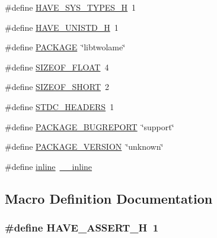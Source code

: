 \begin{DoxyCompactItemize}
\item 
\#define \hyperlink{lib-src_2twolame_2win32_2configwin_8h_a69dc70bea5d1f8bd2be9740e974fa666}{H\+A\+V\+E\+\_\+\+S\+Y\+S\+\_\+\+T\+Y\+P\+E\+S\+\_\+H}~1
\item 
\#define \hyperlink{lib-src_2twolame_2win32_2configwin_8h_a219b06937831d0da94d801ab13987639}{H\+A\+V\+E\+\_\+\+U\+N\+I\+S\+T\+D\+\_\+H}~1
\item 
\#define \hyperlink{lib-src_2twolame_2win32_2configwin_8h_aca8570fb706c81df371b7f9bc454ae03}{P\+A\+C\+K\+A\+GE}~\char`\"{}libtwolame\char`\"{}
\item 
\#define \hyperlink{lib-src_2twolame_2win32_2configwin_8h_a0c4343d1f6e7b7ce4f470d9ea69ad0b4}{S\+I\+Z\+E\+O\+F\+\_\+\+F\+L\+O\+AT}~4
\item 
\#define \hyperlink{lib-src_2twolame_2win32_2configwin_8h_a391756f658c0bdad5fa65c4cd3410ad6}{S\+I\+Z\+E\+O\+F\+\_\+\+S\+H\+O\+RT}~2
\item 
\#define \hyperlink{lib-src_2twolame_2win32_2configwin_8h_a550e5c272cc3cf3814651721167dcd23}{S\+T\+D\+C\+\_\+\+H\+E\+A\+D\+E\+RS}~1
\item 
\#define \hyperlink{lib-src_2twolame_2win32_2configwin_8h_a1d1d2d7f8d2f95b376954d649ab03233}{P\+A\+C\+K\+A\+G\+E\+\_\+\+B\+U\+G\+R\+E\+P\+O\+RT}~\char`\"{}support\char`\"{}
\item 
\#define \hyperlink{lib-src_2twolame_2win32_2configwin_8h_aa326a05d5e30f9e9a4bb0b4469d5d0c0}{P\+A\+C\+K\+A\+G\+E\+\_\+\+V\+E\+R\+S\+I\+ON}~\char`\"{}unknown\char`\"{}
\item 
\#define \hyperlink{lib-src_2twolame_2win32_2configwin_8h_a00d24c7231be28dbaf71f5408f30e44c}{inline}~\hyperlink{cdefs_8h_a96deb7ba5a74848afb710cc4ee6d2c08}{\+\_\+\+\_\+inline}
\end{DoxyCompactItemize}


\subsection{Macro Definition Documentation}
\subsubsection[{\texorpdfstring{H\+A\+V\+E\+\_\+\+A\+S\+S\+E\+R\+T\+\_\+H}{HAVE_ASSERT_H}}]{\setlength{\rightskip}{0pt plus 5cm}\#define H\+A\+V\+E\+\_\+\+A\+S\+S\+E\+R\+T\+\_\+H~1}\hypertarget{lib-src_2twolame_2win32_2configwin_8h_ad0eabe2e5407bc73450eb15b657983cd}{}\label{lib-src_2twolame_2win32_2configwin_8h_ad0eabe2e5407bc73450eb15b657983cd}


